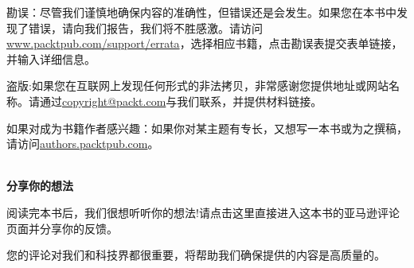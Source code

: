 勘误：尽管我们谨慎地确保内容的准确性，但错误还是会发生。如果您在本书中发现了错误，请向我们报告，我们将不胜感激。请访问\url{www.packtpub.com/support/errata}，选择相应书籍，点击勘误表提交表单链接，并输入详细信息。

盗版:如果您在互联网上发现任何形式的非法拷贝，非常感谢您提供地址或网站名称。请通过\url{copyright@packt.com}与我们联系，并提供材料链接。

如果对成为书籍作者感兴趣：如果你对某主题有专长，又想写一本书或为之撰稿，请访问\url{authors.packtpub.com}。

\hspace*{\fill} \\ %
\textbf{分享你的想法}

阅读完本书后，我们很想听听你的想法!请点击这里直接进入这本书的亚马逊评论页面并分享你的反馈。

您的评论对我们和科技界都很重要，将帮助我们确保提供的内容是高质量的。

\newpage






















